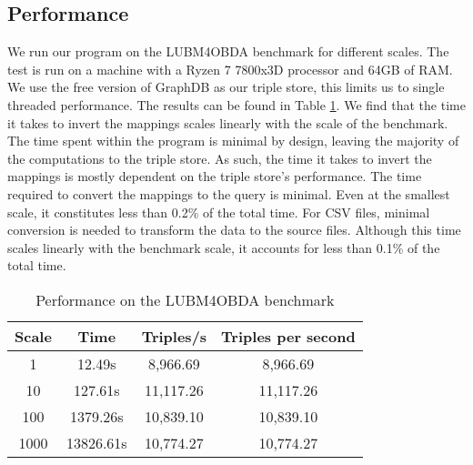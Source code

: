 \subsection{Performance}
We run our program on the LUBM4OBDA benchmark for different scales. The test is run on a machine with a Ryzen 7 7800x3D processor and 64GB of RAM. We use the free version of GraphDB as our triple store, this limits us to single threaded performance. The results can be found in Table \ref{table:lubm4obda_performance}. We find that the time it takes to invert the mappings scales linearly with the scale of the benchmark. The time spent within the program is minimal by design, leaving the majority of the computations to the triple store. As such, the time it takes to invert the mappings is mostly dependent on the triple store's performance. The time required to convert the mappings to the query is minimal. Even at the smallest scale, it constitutes less than 0.2\% of the total time. For CSV files, minimal conversion is needed to transform the data to the source files. Although this time scales linearly with the benchmark scale, it accounts for less than 0.1\% of the total time.

\begin{table}[h]
    \centering
    \begin{tabular}{|c|c|c|c|}
        \hline
        \textbf{Scale} & \textbf{Time} & \textbf{Triples/s} & \textbf{Triples per second} \\
        \hline
        1 & 12.49s & 8,966.69 & 8,966.69 \\
        10 & 127.61s & 11,117.26 & 11,117.26 \\
        100 & 1379.26s & 10,839.10 & 10,839.10 \\
        1000 & 13826.61s & 10,774.27 & 10,774.27 \\
        \hline
    \end{tabular}
    \caption{Performance on the LUBM4OBDA benchmark}
    \label{table:lubm4obda_performance}
\end{table}

